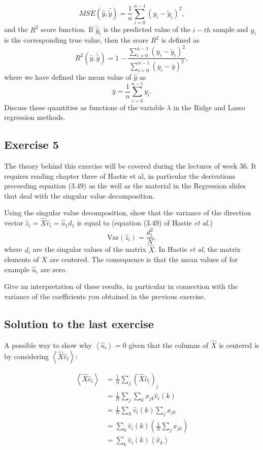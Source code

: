 \documentclass[%
oneside,                 %
final,                   %
10pt]{article}
\begin{document}
\noindent
\[ MSE(\hat{y},\hat{\tilde{y}}) = \frac{1}{n}
\sum_{i=0}^{n-1}(y_i-\tilde{y}_i)^2, 
\] 
and the $R^2$ score function.
If $\tilde{\hat{y}}_i$ is the predicted value of the $i-th$ sample and $y_i$ is the corresponding true value, then the score $R^2$ is defined as
\[
R^2(\hat{y}, \tilde{\hat{y}}) = 1 - \frac{\sum_{i=0}^{n - 1} (y_i - \tilde{y}_i)^2}{\sum_{i=0}^{n - 1} (y_i - \bar{y})^2},
\]
where we have defined the mean value  of $\hat{y}$ as
\[
\bar{y} =  \frac{1}{n} \sum_{i=0}^{n - 1} y_i.
\]
Discuss these quantities as functions of the variable $\lambda$ in the Ridge and Lasso regression methods. 

\subsection{Exercise 5}

The theory behind this exercise will be covered during the lectures of week 36. It requires reading chapter three of Hastie et al, in particular the derivations preceeding equation (3.49) as the well as the material in the Regression slides that deal with the singular value decomposition. 

Using the singular value decomposition, show that the variance of the direction vector 
$\hat{z}_i=\hat{X}\hat{v}_i=\hat{u}_1d_1$   is equal to (equation (3.49) of Hastie \emph{et al.})
\[
\mathrm{Var}(\hat{z}_i)=\frac{d_i^2}{N},
\]
where $d_i$ are the singular values of the matrix $\hat{X}$. In Hastie \emph{et al}, the matrix elements of $X$ are centered. The consequence is that the mean values of for example $\hat{u}_i$ are zero. 

Give an interpretation of these results, in particular in connection with the variance of the coefficients you obtained in the previous exercise.   


\subsection{Solution to the last exercise}

A possible way to show why $\left \langle \hat u_i \right \rangle = 0$
given that the columns of $\hat X$ is centered is by considering
$\left \langle \hat X \hat v_i \right \rangle$:


\begin{align*} \left \langle \hat X \hat v_i \right \rangle &= \frac{1}{N}\sum_j ( \hat X \hat v_i )_j \\ &= \frac{1}{N}\sum_j \sum_k x_{jk}\hat v_i(k)\\ &= \frac{1}{N}\sum_k \hat v_i(k) \sum_j x_{jk} \\ &= \sum_k \hat v_i(k)\left( \frac{1}{N}\sum_j x_{jk} \right) \\ &= \sum_k \hat v_i(k) \left \langle \hat x_k \right \rangle
\end{align*}
\end{document}
